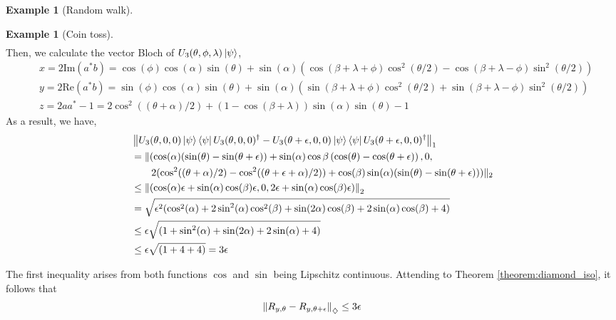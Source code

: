 \documentclass[10pt,a4paper]{amsart}
\theoremstyle{definition}
\theoremstyle{definition}
\newtheorem{example}[definition]{Example}
\theoremstyle{definition}
\theoremstyle{definition}
\theoremstyle{definition}
\theoremstyle{definition}
\begin{document}
\begin{example}[Random walk]
\begin{example}[Coin toss]
\begin{align*}
\end{align*}
Then, we calculate the vector Bloch of $U_3(\theta, \phi, \lambda) \ket{\psi}$,
\begin{align*}
  &x = 2 \text{Im} \left( a^{*}b \right) =   \cos(\phi) \cos(\alpha) \sin(\theta) +  \sin(\alpha) \left(\cos{(\beta + \lambda + \phi)} \cos^2(\theta/2) - \cos{(\beta + \lambda - \phi)} \sin^2(\theta/2)\right)  \\
  &y = 2 \text{Re} \left( a^{*}b \right) = \sin(\phi) \cos(\alpha) \sin(\theta) +  \sin(\alpha) \left(\sin{(\beta + \lambda + \phi)} \cos^2(\theta/2) + \sin{(\beta + \lambda - \phi)} \sin^2(\theta/2)\right) \\
  & z = 2 aa^* -1 = 2 \cos^2((\theta+\alpha)/2)+(1-\cos(\beta + \lambda))\sin(\alpha)\sin(\theta) -1
\end{align*}
As a result, we have,
\begin{align*}
  & \left\lVert U_3(\theta, 0, 0) \ket{\psi}\bra{\psi} U_3(\theta, 0, 0)^\dag - U_3(\theta + \epsilon, 0, 0) \ket{\psi}\bra{\psi}U_3(\theta+\epsilon, 0, 0)^\dag  \right\rVert_{1} \\
  & = \lVert ( \cos(\alpha) (\sin(\theta) - \sin(\theta + \epsilon)) +  \sin(\alpha) \cos{\beta} \left(\cos(\theta) - \cos(\theta + \epsilon) \right) , 0,\\
  & \hspace{20pt} 2 (\cos^2((\theta+\alpha)/2) - \cos^2((\theta+ \epsilon+\alpha)/2))+\cos(\beta) \sin(\alpha)(\sin(\theta) - \sin(\theta+\epsilon)) )\rVert_2 \\
  &  \leq \left\lVert ( \cos(\alpha)\epsilon + \sin(\alpha)\cos(\beta) \epsilon, 0, 2\epsilon + \sin(\alpha)\cos(\beta) \epsilon) \right\rVert_{2} \\
  & = \sqrt{\epsilon^2(\cos^2(\alpha) + 2\sin^2(\alpha)\cos^2(\beta)+\sin(2\alpha)\cos(\beta) + 2\sin(\alpha)\cos(\beta) + 4 )} \\
  &\leq \epsilon \sqrt{(1 + \sin^2(\alpha) +\sin(2\alpha) + 2\sin(\alpha) + 4 )} \\
  & \leq \epsilon \sqrt{(1 + 4 + 4 )} = 3 \epsilon
\end{align*}

The first inequality arises from both functions $\cos$ and $\sin$ being Lipschitz continuous. Attending to Theorem \ref{theorem:diamond_iso}, it follows that
  \begin{align*}
    \left\lVert R_{y, \theta}- R_{y, \theta + \epsilon}  \right\rVert_{\diamondsuit} \leq 3 \epsilon
  \end{align*}


\end{example}
\end{example}
\end{document}

